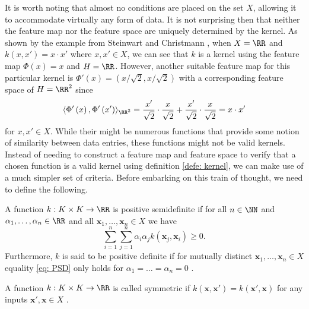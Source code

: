 It is worth noting that almost no conditions are placed on the set $X$, allowing it to accommodate virtually any form of data. It is not surprising then that neither the feature map nor the feature space are uniquely determined by the kernel. As shown by the example from Steinwart and Christmann \cite{SteinwartIngo2008SVMb}, when $X = \RR$ and $k \left( x , x' \right) = x \cdot x'$ where $x , x' \in X$, we can see that $k$ is a kernel using the feature map $\Phi \left( x \right) = x$ and $H = \RR$. However, another suitable feature map for this particular kernel is $\Phi' \left( x \right) = \left( x / \sqrt{2} , x / \sqrt{2} \right)$ with a corresponding feature space of $H = \RR^2$ since
\[
    \langle \Phi' \left( x \right), \Phi' \left( x' \right) \rangle_{\RR^2} = \frac{x'}{\sqrt{2}} \cdot \frac{x}{\sqrt{2}} + \frac{x'}{\sqrt{2}} \cdot \frac{x}{\sqrt{2}} = x \cdot x'
\]
for $x,x' \in X$. While their might be numerous functions that provide some notion of similarity between data entries, these functions might not be valid kernels. Instead of needing to construct a feature map and feature space to verify that a chosen function is a valid kernel using definition \ref{defe: kernel}, we can make use of a much simpler set of criteria. Before embarking on this train of thought, we need to define the following.

\begin{defe} \label{defe: PD}
    A function $k : K \times K \to \RR$ is positive semidefinite if for all $n \in \NN$ and $\alpha_1 , \ldots , \alpha_n \in \RR$ and all $\bm{x}_1 ,\ldots , \bm{x}_n \in X$ we have
    \begin{equation}\label{eq: PSD}
        \sum_{i=1}^{n} \sum_{j=1}^{n} \alpha_i \alpha_j k \left( \bm{x}_j , \bm{x}_i \right) \geq 0.
    \end{equation}
    Furthermore, $k$ is said to be positive definite if for mutually distinct $\bm{x}_1 ,\ldots , \bm{x}_n \in X$ equality \ref{eq: PSD} only holds for $\alpha_1 = \ldots = \alpha_n = 0$ \cite{SteinwartIngo2008SVMb}.
\end{defe}

\begin{defe}[Symmetric] \label{defe: Symmetric_function}
    A function $k : K \times K \to \RR$ is called symmetric if $k \left( \bm{x} , \bm{x}' \right) = k \left( \bm{x}' , \bm{x} \right)$ for any inputs $\bm{x}' , \bm{x} \in X$ \cite{SteinwartIngo2008SVMb}.
\end{defe}

